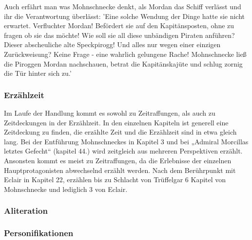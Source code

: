{Auch erfährt man was Mohnschnecke denkt, als Mordan das Schiff verlässt und ihr die Verantwortung überlässt: 'Eine solche Wendung der Dinge hatte sie nicht erwartet. Verfluchter Mordan! Befördert sie auf den Kapitänsposten, ohne zu fragen ob sie das möchte! Wie soll sie all diese unbändigen Piraten anführen? Dieser abscheuliche alte Speckpirogg! Und alles nur wegen einer einzigen Zurückweisung? Keine Frage - eine wahrlich gelungene Rache! Mohnschnecke ließ die Piroggen Mordan nachschauen, betrat die Kapitänskajüte und schlug zornig die Tür hinter sich zu.'\cite[S.375]{pir}


\subsubsection{Erzählzeit}

Im Laufe der Handlung kommt es sowohl zu Zeitraffungen, als auch zu Zeitdeckungen in der Erzählzeit. In den einzelnen Kapiteln ist generell eine Zeitdeckung zu finden, die erzählte Zeit und die Erzählzeit sind in etwa gleich lang. Bei der Entführung Mohnschneckes in Kapitel 3 und bei „Admiral Morcillas letztes Gefecht“ (kapitel 44.) wird zeitgleich aus mehreren Perspektiven erzählt. Ansonsten kommt es meist zu Zeitraffungen, da die Erlebnisse der einzelnen Hauptprotagonisten abwechselnd erzählt werden.  Nach dem Berührpunkt mit Eclair in Kapitel 22, erzählen bis zu Schlacht von Trüffelgar 6 Kapitel von Mohnschnecke und lediglich 3 von Eclair.


\subsubsection{Aliteration}

\subsubsection{Personifikationen}

}
